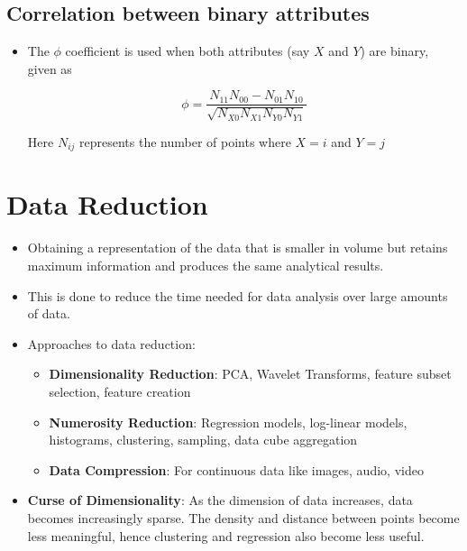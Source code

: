 \documentclass{article}
\theoremstyle{plain}
\theoremstyle{definition}
\begin{document}
\subsection{Correlation between binary attributes}
\begin{itemize}
    \item The $\phi$ coefficient is used when both attributes (say $X$ and $Y$) are binary, given as
    
    \begin{equation}
        \phi = \frac{N_{11} N_{00} - N_{01} N_{10}}{\sqrt{N_{X0} N_{X1} N_{Y0} N_{Y1}}}
    \end{equation}
    
    Here $N_{ij}$ represents the number of points where $X=i$ and $Y=j$
\end{itemize}
\section{Data Reduction}
\begin{itemize}
    \item Obtaining a representation of the data that is smaller in volume but retains maximum information and produces the same analytical results. 
    
    \item This is done to reduce the time needed for data analysis over large amounts of data. 
    
    \item Approaches to data reduction:
    \begin{itemize}
        \item \textbf{Dimensionality Reduction}: PCA, Wavelet Transforms, feature subset selection, feature creation
        
        \item \textbf{Numerosity Reduction}: Regression models, log-linear models, histograms, clustering, sampling, data cube aggregation
        
        \item \textbf{Data Compression}: For continuous data like images, audio, video
    \end{itemize}
    
    \item \textbf{Curse of Dimensionality}: As the dimension of data increases, data becomes increasingly sparse. The density and distance between points become less meaningful, hence clustering and regression also become less useful. 
\end{itemize}
\end{document}
